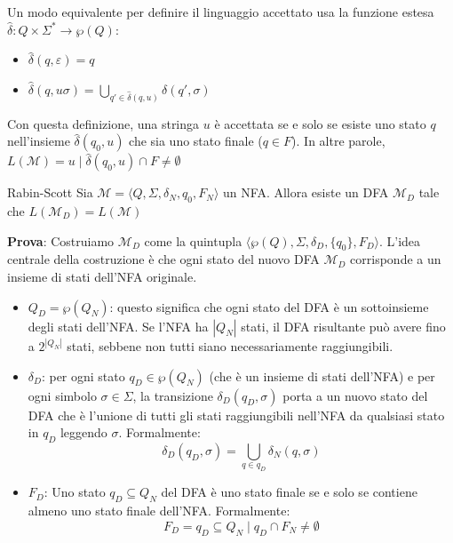 \documentclass[12pt, a4paper]{report}
\begin{document}
\begin{itemize}
                    Un modo equivalente per definire il linguaggio accettato usa la funzione estesa $\hat{\delta} : Q \times \Sigma^* \to \wp(Q)$: \begin{itemize}
                        \item $\hat{\delta}(q, \varepsilon) = {q}$
                        \item $\hat{\delta}(q, u\sigma) = \bigcup_{q' \in \hat{\delta}(q, u)} \delta(q', \sigma)$
                    \end{itemize}
                    Con questa definizione, una stringa $u$ è accettata se e solo se esiste uno stato $q$ nell'insieme $\hat{\delta}(q_0, u)$ che sia uno stato finale ($q \in F$). In altre parole, $L(\mathcal{M}) = {u \mid \hat{\delta}(q_0, u) \cap F \neq \emptyset }$
                \end{itemize}
                \begin{theorembox}{Rabin-Scott}{}
                    Sia $\mathcal{M}=\langle Q,\Sigma,\delta_N,q_0,F_N\rangle$ un NFA. Allora esiste un DFA $\mathcal{M}_D$ tale che $L(\mathcal{M}_D)=L(\mathcal{M})$
                \end{theorembox}
                \textbf{Prova}: Costruiamo $\mathcal{M}_D$ come la quintupla $\langle\wp(Q),\Sigma,\delta_D,\{q_0\},F_D\rangle$. L'idea centrale della costruzione è che ogni stato del nuovo DFA $\mathcal{M}_D$ corrisponde a un insieme di stati dell'NFA originale.
                \begin{itemize}
                    \item $Q_D=\wp(Q_N)$: questo significa che ogni stato del DFA è un sottoinsieme degli stati dell'NFA. Se l'NFA ha $|Q_N|$ stati, il DFA risultante può avere fino a $2^{|Q_N|}$ stati, sebbene non tutti siano necessariamente raggiungibili.
                    \item $\delta_D$: per ogni stato $q_D\in\wp(Q_N)$ (che è un insieme di stati dell'NFA) e per ogni simbolo $\sigma \in \Sigma$, la transizione $\delta_D(q_D, \sigma)$ porta a un nuovo stato del DFA che è l'unione di tutti gli stati raggiungibili nell'NFA da qualsiasi stato in $q_D$ leggendo $\sigma$. Formalmente: \begin{equation*}
                        \delta_D(q_D, \sigma) = \bigcup_{q \in q_D} \delta_N(q, \sigma)
                    \end{equation*}
                    \item $F_D$: Uno stato $q_D \subseteq Q_N$ del DFA è uno stato finale se e solo se contiene almeno uno stato finale dell'NFA. Formalmente: \begin{equation*}
                        F_D = {q_D \subseteq Q_N \mid q_D \cap F_N \neq \emptyset}
                    \end{equation*}
                \end{itemize}
\end{document}
